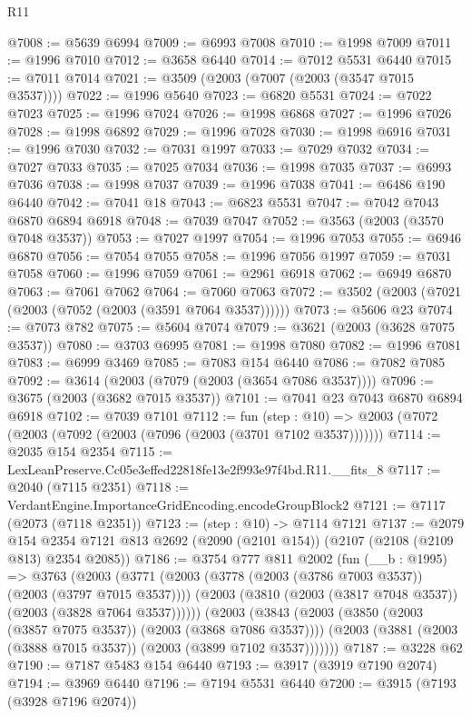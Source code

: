 \begin{lexlean}{R11}
\begin{coremodule}
@7008 := @5639 @6994
@7009 := @6993 @7008
@7010 := @1998 @7009
@7011 := @1996 @7010
@7012 := @3658 @6440
@7014 := @7012 @5531 @6440
@7015 := @7011 @7014
@7021 := @3509 (@2003 (@7007 (@2003 (@3547 @7015 @3537))))
@7022 := @1996 @5640
@7023 := @6820 @5531
@7024 := @7022 @7023
@7025 := @1996 @7024
@7026 := @1998 @6868
@7027 := @1996 @7026
@7028 := @1998 @6892
@7029 := @1996 @7028
@7030 := @1998 @6916
@7031 := @1996 @7030
@7032 := @7031 @1997
@7033 := @7029 @7032
@7034 := @7027 @7033
@7035 := @7025 @7034
@7036 := @1998 @7035
@7037 := @6993 @7036
@7038 := @1998 @7037
@7039 := @1996 @7038
@7041 := @6486 @190 @6440
@7042 := @7041 @18
@7043 := @6823 @5531
@7047 := @7042 @7043 @6870 @6894 @6918
@7048 := @7039 @7047
@7052 := @3563 (@2003 (@3570 @7048 @3537))
@7053 := @7027 @1997
@7054 := @1996 @7053
@7055 := @6946 @6870
@7056 := @7054 @7055
@7058 := @1996 @7056 @1997
@7059 := @7031 @7058
@7060 := @1996 @7059
@7061 := @2961 @6918
@7062 := @6949 @6870
@7063 := @7061 @7062
@7064 := @7060 @7063
@7072 := @3502 (@2003 (@7021 (@2003 (@7052 (@2003 (@3591 @7064 @3537))))))
@7073 := @5606 @23
@7074 := @7073 @782
@7075 := @5604 @7074
@7079 := @3621 (@2003 (@3628 @7075 @3537))
@7080 := @3703 @6995
@7081 := @1998 @7080
@7082 := @1996 @7081
@7083 := @6999 @3469
@7085 := @7083 @154 @6440
@7086 := @7082 @7085
@7092 := @3614 (@2003 (@7079 (@2003 (@3654 @7086 @3537))))
@7096 := @3675 (@2003 (@3682 @7015 @3537))
@7101 := @7041 @23 @7043 @6870 @6894 @6918
@7102 := @7039 @7101
@7112 := fun (step : @10) =>
  @2003 (@7072 (@2003 (@7092 (@2003 (@7096 (@2003 (@3701 @7102 @3537)))))))
@7114 := @2035 @154 @2354
@7115 := LexLeanPreserve.Cc05e3effed22818fe13e2f993e97f4bd.R11.__fits_8
@7117 := @2040 (@7115 @2351)
@7118 := VerdantEngine.ImportanceGridEncoding.encodeGroupBlock2
@7121 := @7117 (@2073 (@7118 @2351))
@7123 := (step : @10) -> @7114 @7121
@7137 := @2079
    @154
    @2354
    @7121
    @813
    @2692
    (@2090 (@2101 @154))
    (@2107 (@2108 (@2109 @813) @2354 @2085))
@7186 := @3754
    @777
    @811
    @2002
    (fun (__b : @1995) =>
    @3763
      (@2003
        (@3771
          (@2003 (@3778 (@2003 (@3786 @7003 @3537)) (@2003 (@3797 @7015 @3537))))
          (@2003 (@3810 (@2003 (@3817 @7048 @3537)) (@2003 (@3828 @7064 @3537))))))
      (@2003
        (@3843
          (@2003 (@3850 (@2003 (@3857 @7075 @3537)) (@2003 (@3868 @7086 @3537))))
          (@2003 (@3881 (@2003 (@3888 @7015 @3537)) (@2003 (@3899 @7102 @3537)))))))
@7187 := @3228 @62
@7190 := @7187 @5483 @154 @6440
@7193 := @3917 (@3919 @7190 @2074)
@7194 := @3969 @6440
@7196 := @7194 @5531 @6440
@7200 := @3915 (@7193 (@3928 @7196 @2074))

\end{coremodule}
\end{lexlean}
